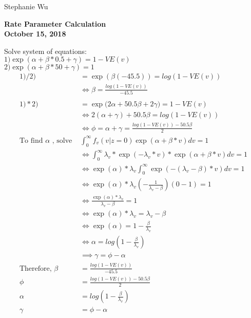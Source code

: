 \documentclass[10pt, letter]{article}
\begin{document}
\begin{flushleft}
\large{Stephanie Wu}
\end{flushleft}
\begin{center}
\large\textbf{Rate Parameter Calculation\\
October 15, 2018\\}
\end{center}

Solve system of equations:\\ 
$1) \exp(\alpha + \beta*0.5 + \gamma) = 1 - VE(v)$\\
$2) \exp(\alpha + \beta*50 + \gamma) = 1$\\
\begin{align*}
1)/ 2) &= \exp(\beta(-45.5)) = log(1-VE(v))\\
&\iff \beta = \frac{log(1-VE(v))}{-45.5}\\
\\
1)*2) &= \exp\Big(2\alpha + 50.5\beta + 2\gamma\Big) = 1-VE(v)\\
&\iff 2(\alpha + \gamma) + 50.5\beta = log(1-VE(v))\\
&\iff \phi = \alpha + \gamma = \frac{log(1-VE(v)) - 50.5\beta}{2}\\
\text{To find } \alpha \text{ , solve } &\int_0^\infty f_v(v|z=0)\exp(\alpha+\beta*v)dv = 1\\
&\iff \int_0^\infty \lambda_v* \exp(-\lambda_v*v)*\exp(\alpha + \beta*v)dv = 1\\
&\iff \exp(\alpha)*\lambda_v \int_0^\infty\exp(-(\lambda_v - \beta)*v)dv = 1\\
&\iff \exp(\alpha)*\lambda_v (-\frac{1}{\lambda_v - \beta})(0 - 1) = 1\\
&\iff \frac{\exp(\alpha)*\lambda_v}{\lambda_v - \beta} = 1\\
&\iff \exp(\alpha)*\lambda_v = \lambda_v - \beta\\
&\iff \exp(\alpha) = 1 - \frac{\beta}{\lambda_v}\\
&\iff \alpha = log(1 - \frac{\beta}{\lambda_v})\\
&\implies \gamma = \phi - \alpha\\
\text{Therefore, } \beta &= \frac{log(1-VE(v))}{-45.5}\\
\phi &= \frac{log(1-VE(v)) - 50.5\beta}{2}\\
\alpha &= log(1 - \frac{\beta}{\lambda_v})\\
\gamma &= \phi - \alpha\\
\end{align*}
\end{document}
